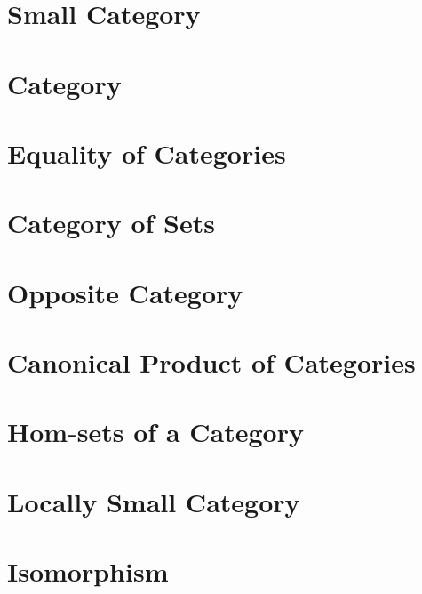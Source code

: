 \section{Small Category}
    
\section{Category}
    
\section{Equality of Categories}\label{section:cat:equal}
    
\section{Category of Sets}
    
\section{Opposite Category}
    
\section{Canonical Product of Categories}
    
\section{Hom-sets of a Category}
    
\section{Locally Small Category}
    
\section{Isomorphism}
    
